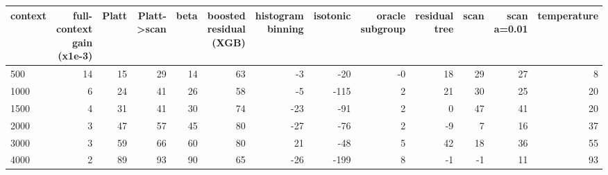 \begin{tabular}{lrrrrrrrrrrrr}
\toprule
context & full-context gain (x1e-3) & Platt & Platt->scan & beta & boosted residual (XGB) & histogram binning & isotonic & oracle subgroup & residual tree & scan & scan a=0.01 & temperature \\
\midrule
500 & 14 & 15 & 29 & 14 & 63 & -3 & -20 & -0 & 18 & 29 & 27 & 8 \\
1000 & 6 & 24 & 41 & 26 & 58 & -5 & -115 & 2 & 21 & 30 & 25 & 20 \\
1500 & 4 & 31 & 41 & 30 & 74 & -23 & -91 & 2 & 0 & 47 & 41 & 20 \\
2000 & 3 & 47 & 57 & 45 & 80 & -27 & -76 & 2 & -9 & 7 & 16 & 37 \\
3000 & 3 & 59 & 66 & 60 & 80 & 21 & -48 & 5 & 42 & 18 & 36 & 55 \\
4000 & 2 & 89 & 93 & 90 & 65 & -26 & -199 & 8 & -1 & -1 & 11 & 93 \\
\bottomrule
\end{tabular}
